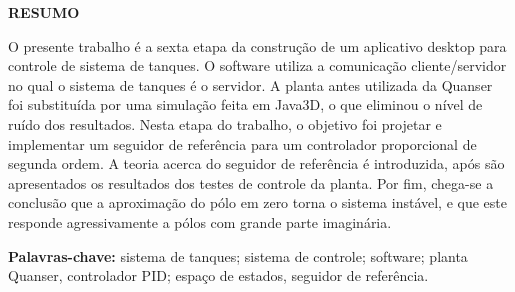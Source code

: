 \documentclass[a4paper,12pt]{article}
\begin{document}
\newpage


\thispagestyle{empty}

\begin{center}
{\large \textbf{RESUMO}}
\end{center}

\vspace{3cm}

\begin{flushleft}

\hspace{4ex}O presente trabalho é a sexta etapa da construção de um aplicativo desktop para controle de sistema de tanques. O software utiliza a comunicação cliente/servidor no qual o sistema de tanques é o servidor. A planta antes utilizada da Quanser foi substituída por uma simulação feita em Java3D, o que eliminou o nível de ruído dos resultados. Nesta etapa do trabalho, o objetivo foi projetar e implementar um seguidor de referência para um controlador proporcional de segunda ordem. A teoria acerca do seguidor de referência  é introduzida, após são apresentados os resultados dos testes de controle da planta. Por fim, chega-se a conclusão que a aproximação do pólo em zero torna o sistema instável, e que este responde agressivamente a pólos com grande parte imaginária. \\

\end{flushleft}

\vspace{1.5cm}

\textbf{Palavras-chave:} sistema de tanques; sistema de controle; software; planta Quanser, controlador PID; espaço de estados, seguidor de referência.

\newpage


\thispagestyle{empty}

\begin{center}
\listoffigures
\end{center}

\newpage


\thispagestyle{empty}

\begin{center}
\tableofcontents
\end{center}

\newpage
\end{document}
